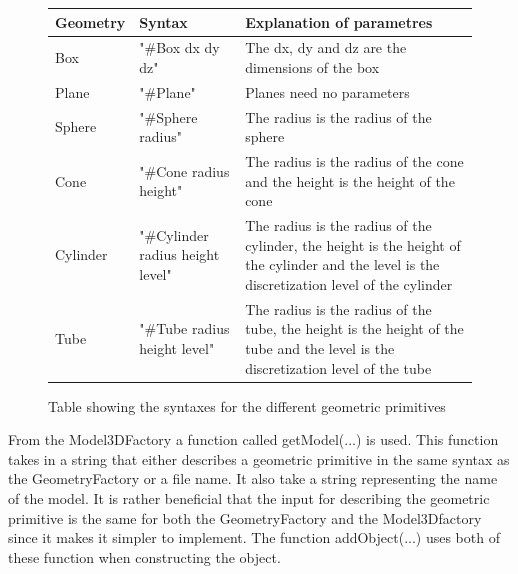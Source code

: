\begin{figure}[h]
\centering
\begin{tabular}{|l|l|l|}
\hline
Geometry & Syntax                           & Explanation of parametres                                                                                                                    \\ \hline
Box      & "\#Box dx dy dz"                 & The dx, dy and dz are the dimensions of the box                                                                                              \\ \hline
Plane    & "\#Plane"                        & Planes need no parameters                                                                                                                    \\ \hline
Sphere   & "\#Sphere radius"                & The radius is the radius of the sphere                                                                                                       \\ \hline
Cone     & "\#Cone radius height"           & The radius is the radius of the cone and the height is the height of the cone                                                                \\ \hline
Cylinder & "\#Cylinder radius height level" & The radius is the radius of the cylinder, the height is the height of the cylinder and the level is the discretization level of the cylinder \\ \hline
Tube     & "\#Tube radius height level"     & The radius is the radius of the tube, the height is the height of the tube and the level is the discretization level of the tube             \\ \hline
\end{tabular}
\caption{Table showing the syntaxes for the different geometric primitives}
\label{fig:SyntaxTable}
\end{figure}

From the Model3DFactory a function called getModel(...) is used. This function takes in a string that either describes a geometric primitive in the same syntax as the GeometryFactory or a file name. It also take a string representing the name of the model. It is rather beneficial that the input for describing the geometric primitive is the same for both the GeometryFactory and the Model3Dfactory since it makes it simpler to implement. The function addObject(...) uses both of these function when constructing the object.\\

